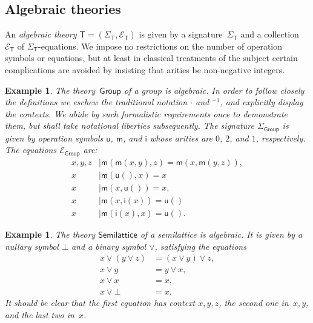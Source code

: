 \documentclass{amsart}
\newcommand{\theory}[1]{\mathsf{#1}} %
\newcommand{\signature}[1]{\Sigma_{\theory{#1}}} %
\newcommand{\equations}[1]{\mathcal{E}_{\theory{#1}}} %
\newtheorem{example}[definition]{Example}
\begin{document}
\subsection{Algebraic theories}
\label{sec:algebraic-theories-1}

An \emph{algebraic theory $\theory{T} = (\signature{T}, \equations{T})$} is given by a
signature~$\signature{T}$ and a collection $\equations{T}$ of $\signature{T}$-equations.
%
We impose no restrictions on the number of operation symbols or equations, but at least in
classical treatments of the subject certain complications are avoided by insisting that
arities be non-negative integers.

\begin{example}
  \label{ex:theory-group}
  The theory~$\theory{Group}$ of a group is algebraic. In order to follow closely the
  definitions we eschew the traditional notation $\cdot$ and ${}^{-1}$, and explicitly
  display the contexts. We abide by such formalistic requirements once to demonstrate
  them, but shall take notational liberties subsequently.
  The signature $\signature{Group}$ is given by operation symbols $\mathsf{u}$,
  $\mathsf{m}$, and $\mathsf{i}$ whose arities are $0$, $2$, and $1$, respectively. The
  equations $\equations{Group}$ are:
  \begin{align*}
    x, y, z &\mid \mathsf{m}(\mathsf{m}(x, y), z) = \mathsf{m}(x, \mathsf{m}(y, z)),\\
    x &\mid \mathsf{m}(\mathsf{u}(), x) = x \\
    x &\mid \mathsf{m}(x, \mathsf{u}()) = x,\\
    x &\mid \mathsf{m}(x, \mathsf{i}(x)) = \mathsf{u}()\\
    x &\mid \mathsf{m}(\mathsf{i}(x), x) = \mathsf{u}().
  \end{align*}
\end{example}

\begin{example}
  \label{ex:semi-lattice}
  The theory $\theory{Semilattice}$ of a semilattice is algebraic. It is given by a
  nullary symbol $\bot$ and a binary symbol $\vee$, satisfying the equations
  \begin{align*}
    x \vee (y \vee z) &= (x \vee y) \vee z,\\
    x \vee y &= y \vee x,\\
    x \vee x &= x,\\
    x \vee \bot &= x.
  \end{align*}
  It should be clear that the first equation has context $x, y, z$, the second one
  in~$x, y$, and the last two in~$x$.
\end{example}
\end{document}
